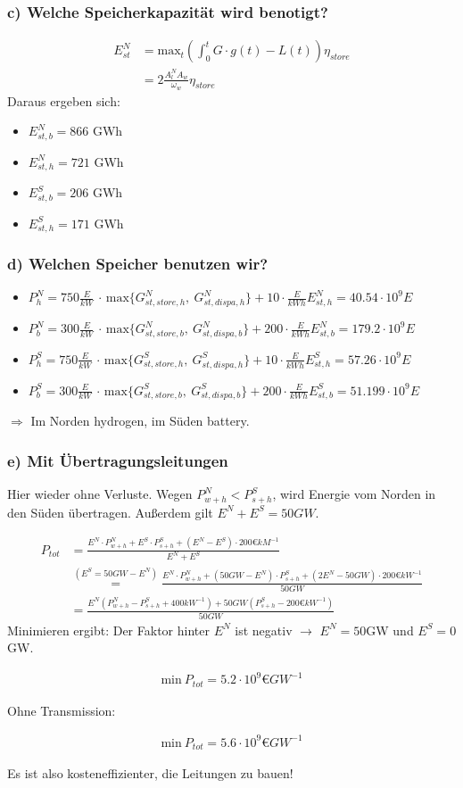 \documentclass[12pt]{article}
\begin{document}
\subsubsection*{c) Welche Speicherkapazit\"at wird benotigt?}

\begin{align*}
	E_{st}^N &= \mathrm{max}_t \left( \int_0^t G\cdot g(t) - L(t) \right) \eta_{store} \\
	&= 2\frac{A_l^N A_w}{\omega_w} \eta_{store}
\end{align*}
Daraus ergeben sich:
\begin{itemize}
	\item $E_{st,b}^N = 866$ GWh
	\item $E_{st,h}^N = 721$ GWh
	\item $E_{st,b}^S = 206$ GWh
	\item $E_{st,h}^S = 171$ GWh
\end{itemize}
\subsubsection*{d) Welchen Speicher benutzen wir?}
\begin{itemize}
	\item $P_h^N = 750\frac{E}{kW}$ $\cdot$ $\mathrm{max}\{G_{st,store,h}^N,\ G_{st,dispa,h}^N\}+10\cdot\frac{E}{kWh} E_{st,h}^N = 40.54\cdot10^9E$
	\item $P_b^N = 300\frac{E}{kW}$ $\cdot$ $\mathrm{max}\{G_{st,store,b}^N,\ G_{st,dispa,b}^N\}+200\cdot\frac{E}{kWh} E_{st,b}^N = 179.2\cdot10^9E$
	\item $P_h^S = 750\frac{E}{kW}$ $\cdot$ $\mathrm{max}\{G_{st,store,h}^S,\ G_{st,dispa,h}^S\}+10\cdot\frac{E}{kWh} E_{st,h}^S = 57.26\cdot10^9E$
	\item $P_b^S = 300\frac{E}{kW}$ $\cdot$ $\mathrm{max}\{G_{st,store,b}^S,\ G_{st,dispa,b}^S\}+200\cdot\frac{E}{kWh} E_{st,b}^S = 51.199\cdot10^9E$
\end{itemize}
$\Rightarrow$ Im Norden hydrogen, im S\"uden battery.

\subsubsection*{e) Mit \"Ubertragungsleitungen}
Hier wieder ohne Verluste.
Wegen $P^N_{w+h} < P_{s+h}^S$, wird Energie vom Norden in den Süden übertragen. Außerdem gilt $E^N+E^S=50GW$.

\begin{align*}
	P_{tot} &= \frac{E^N\cdot P^N_{w+h} + E^S\cdot P_{s+h}^S + (E^N-E^S)\cdot 200 \euro kM^{-1}}{E^N+E^S} \\
	&\overset{(E^S=50GW-E^N)}{=} \frac{E^N\cdot P^N_{w+h}+(50GW-E^N)\cdot P^S_{s+h}+(2E^N-50GW)\cdot 200\euro kW^{-1}}{50GW} \\
	&= \frac{E^N(P^N_{w+h}-P^S_{s+h}+400kW^{-1})+50GW(P^S_{s+h}-200\euro kW^{-1})}{50GW}
\end{align*}
Minimieren ergibt: Der Faktor hinter $E^N$ ist negativ $\rightarrow$ $E^N=50$GW und $E^S=0$GW.

\begin{align*}
	\mathrm{min}\ P_{tot} = 5.2\cdot 10^9 \euro GW^{-1}
\end{align*}

Ohne Transmission:

\begin{align*}
\mathrm{min}\ P_{tot} = 5.6\cdot 10^9 \euro GW^{-1}
\end{align*}

Es ist also kosteneffizienter, die Leitungen zu bauen!
\end{document}
